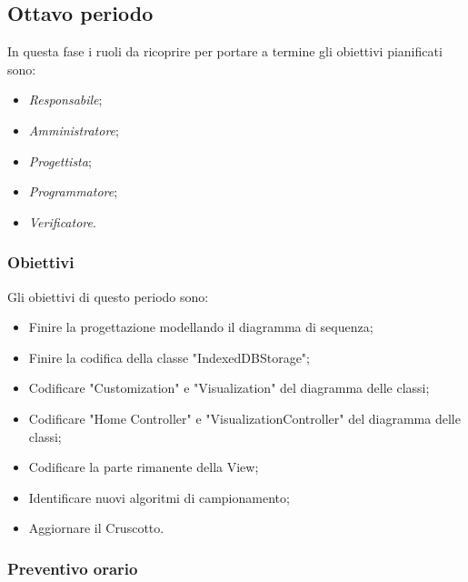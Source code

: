 \subsection{Ottavo periodo}

In questa fase i ruoli da ricoprire per portare a termine gli obiettivi pianificati sono:
\begin{itemize}
    \item \textit{Responsabile};
    \item \textit{Amministratore};
    \item \textit{Progettista};
    \item \textit{Programmatore};
    \item \textit{Verificatore}.
\end{itemize}

\subsubsection{Obiettivi}
Gli obiettivi di questo periodo sono:
\begin{itemize}
    \item Finire la progettazione modellando il diagramma di sequenza;
    \item Finire la codifica della classe "IndexedDBStorage";
    \item Codificare "Customization" e "Visualization" del diagramma delle classi;
    \item Codificare "Home Controller" e "VisualizationController" del diagramma delle classi;
    \item Codificare la parte rimanente della View;
    \item Identificare nuovi algoritmi di campionamento;
    \item Aggiornare il Cruscotto.
\end{itemize}

\subsubsection{Preventivo orario}

